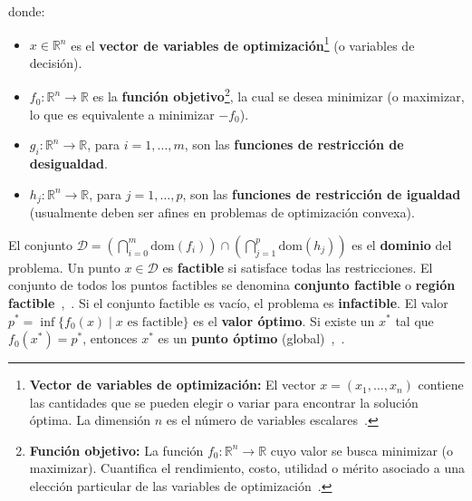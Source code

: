 donde:
\begin{itemize}
    \item $x \in \mathbb{R}^n$ es el \textbf{vector de variables de optimización}\footnote{\textbf{Vector de
          variables de optimización:} El vector $x = (x_1, \dots, x_n)$ contiene las cantidades que se pueden
          elegir o variar para encontrar la solución óptima. La dimensión $n$ es el número de variables escalares~\cite[p.~1]{BoydVandenberghe2004}.} (o variables de decisión).
    \item $f_0: \mathbb{R}^n \to \mathbb{R}$ es la \textbf{función objetivo}\footnote{\textbf{Función objetivo:}
          La función $f_0: \mathbb{R}^n \to \mathbb{R}$ cuyo valor se busca minimizar (o maximizar). Cuantifica
          el rendimiento, costo, utilidad o mérito asociado a una elección particular de las variables de optimización~\cite[p.~1]{BoydVandenberghe2004}.}, la cual se desea minimizar (o maximizar, lo que es equivalente a
          minimizar $-f_0$).
    \item $g_i: \mathbb{R}^n \to \mathbb{R}$, para $i = 1, \dots, m$, son las \textbf{funciones de restricción
          de desigualdad}.
    \item $h_j: \mathbb{R}^n \to \mathbb{R}$, para $j = 1, \dots, p$, son las \textbf{funciones de restricción
          de igualdad} (usualmente deben ser afines en problemas de optimización convexa).
\end{itemize}

El conjunto $\mathcal{D} = \left(\bigcap_{i=0}^m \text{dom}(f_i)\right) \cap \left(\bigcap_{j=1}^p \text{dom}(h_j)\right)$
es el \textbf{dominio} del problema. Un punto $x \in \mathcal{D}$ es \textbf{factible} si satisface todas las
restricciones. El conjunto de todos los puntos factibles se denomina \textbf{conjunto factible} o \textbf{región factible}~\cite[p.~128]{BoydVandenberghe2004},~\cite[p.~90]{BoydVandenbergheSlides2023}. Si el conjunto factible es vacío,
el problema es \textbf{infactible}. El valor $p^* = \inf\{f_0(x) \mid x \text{ es factible}\}$ es el \textbf{valor óptimo}.
Si existe un $x^*$ tal que $f_0(x^*) = p^*$, entonces $x^*$ es un \textbf{punto óptimo} (global)~\cite[p.~128]{BoydVandenberghe2004},~\cite[p.~90]{BoydVandenbergheSlides2023}.

